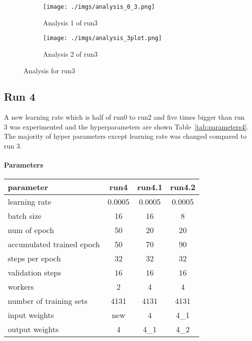 \documentclass[paper=a4, fontsize=11pt]{scrartcl} %
\numberwithin{equation}{section} %
\numberwithin{figure}{section} %
\numberwithin{table}{section} %
\begin{document}
\begin{enumerate}
\begin{itemize}
{\begin{figure}	
	\begin{subfigure}{0.45\textwidth}
	\texttt{[image: ./imgs/analysis\_0\_3.png]} 
	\caption{Analysis 1 of run3}
	\label{fig:subAnalysisRun3}
	\end{subfigure}
	\begin{subfigure}{0.45\textwidth}
	\texttt{[image: ./imgs/analysis\_3plot.png]}
	\caption{Analysis 2 of run3}
	\label{fig:subAnalysisRun3plot}
	\end{subfigure}
	 
	\caption{Analysis for run3}
	\label{fig:AnalysisRun3}
 \end{figure}

\subsection{Run 4}

A new learning rate which is half of run0 to run2 and five times bigger than run 3 was experimented and the hyperparameters are shown Table~\ref{tab:parameters4}. The majority of hyper parameters except learning rate was changed compared to run 3.
\paragraph{Parameters}\label{rubric23}
\begin{table}
	\begin{center}
		\begin{tabular}{ l | c | c | c }
		\hline
		parameter & run4 & run4.1 & run4.2 \\ \hline
		learning rate & 0.0005 & 0.0005 & 0.0005 \\ \hline
		batch size    & 16 & 16 & 8\\ \hline
		num of epoch  & 50 & 20 & 20\\ \hline
		accumulated trained epoch & 50 & 70 & 90\\ \hline
		steps per epoch & 32 & 32  & 32\\ \hline
		validation steps & 16 & 16 & 16\\ \hline
		workers & 2 & 4 & 4\\ \hline
		number of training sets & 4131 & 4131 & 4131\\ \hline
		input weights & new & 4 & 4\_1 \\ \hline
		output weights & 4 & 4\_1 & 4\_2\\ 		
		

\end{tabular}
\end{center}
\end{table}}
\end{itemize}
\end{enumerate}
\end{document}
